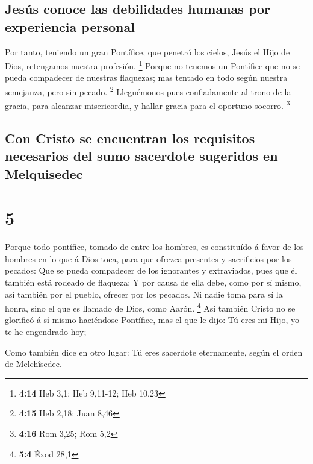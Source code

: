 \hypertarget{jesuxfas-conoce-las-debilidades-humanas-por-experiencia-personal}{%
\subsection{Jesús conoce las debilidades humanas por experiencia
personal}\label{jesuxfas-conoce-las-debilidades-humanas-por-experiencia-personal}}

 Por tanto, teniendo un gran Pontífice, que penetró los
cielos, Jesús el Hijo de Dios, retengamos nuestra profesión. \footnote{\textbf{4:14}
  Heb 3,1; Heb 9,11-12; Heb 10,23}  Porque no tenemos un
Pontífice que no se pueda compadecer de nuestras flaquezas; mas tentado
en todo según nuestra semejanza, pero sin pecado. \footnote{\textbf{4:15}
  Heb 2,18; Juan 8,46}  Lleguémonos pues confiadamente al
trono de la gracia, para alcanzar misericordia, y hallar gracia para el
oportuno socorro. \footnote{\textbf{4:16} Rom 3,25; Rom 5,2}

\hypertarget{con-cristo-se-encuentran-los-requisitos-necesarios-del-sumo-sacerdote-sugeridos-en-melquisedec}{%
\subsection{Con Cristo se encuentran los requisitos necesarios del sumo
sacerdote sugeridos en
Melquisedec}\label{con-cristo-se-encuentran-los-requisitos-necesarios-del-sumo-sacerdote-sugeridos-en-melquisedec}}

\hypertarget{section-4}{%
\section{5}\label{section-4}}

 Porque todo pontífice, tomado de entre los hombres, es
constituído á favor de los hombres en lo que á Dios toca, para que
ofrezca presentes y sacrificios por los pecados:  Que se
pueda compadecer de los ignorantes y extraviados, pues que él también
está rodeado de flaqueza;  Y por causa de ella debe, como
por sí mismo, así también por el pueblo, ofrecer por los pecados.
 Ni nadie toma para sí la honra, sino el que es llamado de
Dios, como Aarón. \footnote{\textbf{5:4} Éxod 28,1}  Así
también Cristo no se glorificó á sí mismo haciéndose Pontífice, mas el
que le dijo: Tú eres mi Hijo, yo te he engendrado hoy;

 Como también dice en otro lugar: Tú eres sacerdote
eternamente, según el orden de Melchîsedec.

